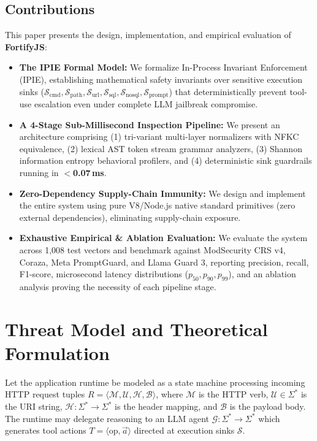\documentclass[conference]{IEEEtran}
\begin{document}
\subsection{Contributions}
This paper presents the design, implementation, and empirical evaluation of \textbf{FortifyJS}:
\begin{itemize}
    \item \textbf{The IPIE Formal Model:} We formalize In-Process Invariant Enforcement (IPIE), establishing mathematical safety invariants over sensitive execution sinks ($\mathcal{S}_{\text{cmd}}, \mathcal{S}_{\text{path}}, \mathcal{S}_{\text{url}}, \mathcal{S}_{\text{sql}}, \mathcal{S}_{\text{nosql}}, \mathcal{S}_{\text{prompt}}$) that deterministically prevent tool-use escalation even under complete LLM jailbreak compromise.
    \item \textbf{A 4-Stage Sub-Millisecond Inspection Pipeline:} We present an architecture comprising (1) tri-variant multi-layer normalizers with NFKC equivalence, (2) lexical AST token stream grammar analyzers, (3) Shannon information entropy behavioral profilers, and (4) deterministic sink guardrails running in \textbf{$<$0.07\,ms}.
    \item \textbf{Zero-Dependency Supply-Chain Immunity:} We design and implement the entire system using pure V8/Node.js native standard primitives (zero external dependencies), eliminating supply-chain exposure.
    \item \textbf{Exhaustive Empirical \& Ablation Evaluation:} We evaluate the system across 1,008 test vectors and benchmark against ModSecurity CRS v4, Coraza, Meta PromptGuard, and Llama Guard 3, reporting precision, recall, F1-score, microsecond latency distributions ($p_{50}, p_{90}, p_{99}$), and an ablation analysis proving the necessity of each pipeline stage.
\end{itemize}

\section{Threat Model and Theoretical Formulation}
Let the application runtime be modeled as a state machine processing incoming HTTP request tuples $R = \langle \mathcal{M}, \mathcal{U}, \mathcal{H}, \mathcal{B} \rangle$, where $\mathcal{M}$ is the HTTP verb, $\mathcal{U} \in \Sigma^*$ is the URI string, $\mathcal{H}: \Sigma^* \to \Sigma^*$ is the header mapping, and $\mathcal{B}$ is the payload body. The runtime may delegate reasoning to an LLM agent $\mathcal{G}: \Sigma^* \to \Sigma^*$ which generates tool actions $T = \langle \text{op}, \vec{a} \rangle$ directed at execution sinks $\mathcal{S}$.
\end{document}
